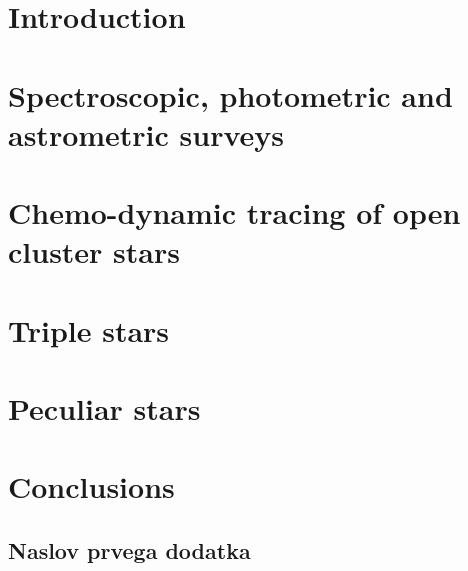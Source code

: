 \pagestyle{fancy}
\fancyhead[CE,RE]{}
\fancyhead[LO,CO]{}
\fancyhead[LE]{\textbf{\nouppercase{\leftmark}}}
\fancyhead[RO]{\textbf{\nouppercase{\rightmark}}}


\chapter{Introduction}



\chapter{Spectroscopic, photometric and astrometric surveys}


\chapter{Chemo-dynamic tracing of open cluster stars}


\chapter{Triple stars}


\chapter{Peculiar stars}


\chapter{Conclusions}




\cleardoublepage{}
\renewcommand\bibname{Bibliography}





\cleardoublepage{}
\renewcommand\appendixname{Appendix}
\begin{appendices}

\chapter{Naslov prvega dodatka}
    

\end{appendices}


